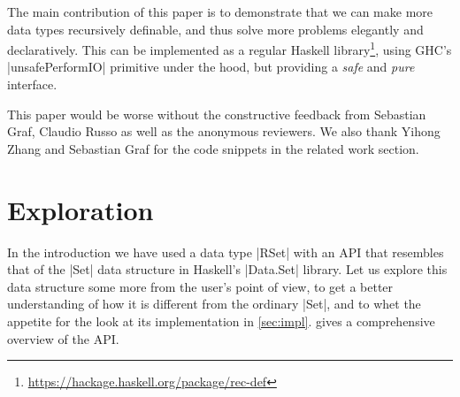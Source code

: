 \documentclass[manuscript,screen,acmsmall,nonacm]{acmart}
\begin{document}

The main contribution of this paper is to demonstrate that we can make more data types recursively definable, and thus solve more problems elegantly and declaratively.
This can be implemented as a regular Haskell library\footnote{\url{https://hackage.haskell.org/package/rec-def}}, using GHC's |unsafePerformIO| primitive under the hood, but providing a \emph{safe} and \emph{pure} interface.

\iffalse
The main contributions of this paper are:

\begin{itemize}
\item We demonstrate that by making more data types recursively definable, more problems can be solved elegantly and declaratively. They are \emph{safe}, \emph{pure} and are a natural fit for a language like Haskell.

\item We show how to implement this as a regular library, using GHC's |unsafePerformIO| primitive under the hood.\footnote{The library can be found as \texttt{rec-def} on Hackage; an anonymized copy is included in this submission.}

\item We discuss the difficulties of answering the question whether a language extension like this can still be considered \emph{pure}, contributing questions rather than conclusive answers.

\end{itemize}
\fi

\begin{acks}
This paper would be worse without the constructive feedback from Sebastian Graf, Claudio Russo as well as the anonymous reviewers. We also thank Yihong Zhang and Sebastian Graf for the code snippets in the related work section.
\end{acks}

\section{Exploration}\label{sec:exploration}

In the introduction we have used a data type |RSet| with an API that resembles that of the |Set| data structure in Haskell's |Data.Set| library. Let us explore this data structure some more from the user's point of view, to get a better understanding of how it is different from the ordinary |Set|, and to whet the appetite for the look at its implementation in \cref{sec:impl}.
 gives a comprehensive overview of the API.
\end{document}
